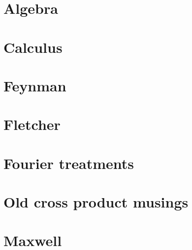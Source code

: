 \part{Algebra}
   
   
   
   
   

\part{Calculus}
   
   
   
   
   
   
   

\part{Feynman}
   

\part{Fletcher}
   

\part{Fourier treatments}
   

\part{Old cross product musings}
   
   

\part{Maxwell}
   
   



